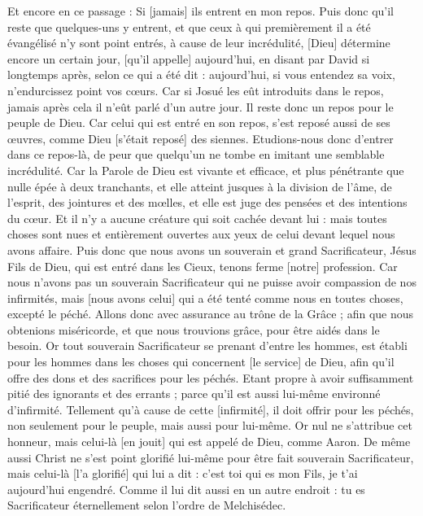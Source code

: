 \begin{multicols}{2}
Et encore en ce passage : Si [jamais] ils entrent en mon repos.
Puis donc qu'il reste que quelques-uns y entrent, et que ceux à qui premièrement il a été évangélisé n'y sont point entrés, à cause de leur incrédulité,
[Dieu] détermine encore un certain jour, [qu'il appelle] aujourd'hui, en disant par David si longtemps après, selon ce qui a été dit : aujourd'hui, si vous entendez sa voix, n'endurcissez point vos cœurs.
Car si Josué les eût introduits dans le repos, jamais après cela il n'eût parlé d'un autre jour.
Il reste donc un repos pour le peuple de Dieu.
Car celui qui est entré en son repos, s'est reposé aussi de ses œuvres, comme Dieu [s'était reposé] des siennes.
Etudions-nous donc d'entrer dans ce repos-là, de peur que quelqu'un ne tombe en imitant une semblable incrédulité.
Car la Parole de Dieu est vivante et efficace, et plus pénétrante que nulle épée à deux tranchants, et elle atteint jusques à la division de l'âme, de l'esprit, des jointures et des mœlles, et elle est juge des pensées et des intentions du cœur.
Et il n'y a aucune créature qui soit cachée devant lui : mais toutes choses sont nues et entièrement ouvertes aux yeux de celui devant lequel nous avons affaire.
Puis donc que nous avons un souverain et grand Sacrificateur, Jésus Fils de Dieu, qui est entré dans les Cieux, tenons ferme [notre] profession.
Car nous n'avons pas un souverain Sacrificateur qui ne puisse avoir compassion de nos infirmités, mais [nous avons celui] qui a été tenté comme nous en toutes choses, excepté le péché.
Allons donc avec assurance au trône de la Grâce ; afin que nous obtenions miséricorde, et que nous trouvions grâce, pour être aidés dans le besoin.
\VerseOne{}Or tout souverain Sacrificateur se prenant d'entre les hommes, est établi pour les hommes dans les choses qui concernent [le service] de Dieu, afin qu'il offre des dons et des sacrifices pour les péchés.
Etant propre à avoir suffisamment pitié des ignorants et des errants ; parce qu'il est aussi lui-même environné d'infirmité.
Tellement qu'à cause de cette [infirmité], il doit offrir pour les péchés, non seulement pour le peuple, mais aussi pour lui-même.
Or nul ne s'attribue cet honneur, mais celui-là [en jouit] qui est appelé de Dieu, comme Aaron.
De même aussi Christ ne s'est point glorifié lui-même pour être fait souverain Sacrificateur, mais celui-là [l'a glorifié] qui lui a dit : c'est toi qui es mon Fils, je t'ai aujourd'hui engendré.
Comme il lui dit aussi en un autre endroit : tu es Sacrificateur éternellement selon l'ordre de Melchisédec.

\end{multicols}
